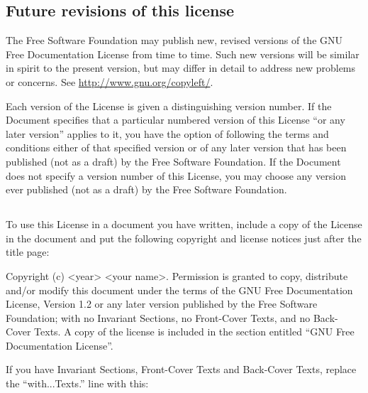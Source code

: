\subsection*{{\tiny{}Future revisions of this license}}

{\tiny{}The Free Software Foundation may publish new, revised versions
of the GNU Free Documentation License from time to time. Such new
versions will be similar in spirit to the present version, but may
differ in detail to address new problems or concerns. See \url{http://www.gnu.org/copyleft/}.}{\tiny\par}

{\tiny{}Each version of the License is given a distinguishing version
number. If the Document specifies that a particular numbered version
of this License \textquotedblleft or any later version\textquotedblright{}
applies to it, you have the option of following the terms and conditions
either of that specified version or of any later version that has
been published (not as a draft) by the Free Software Foundation. If
the Document does not specify a version number of this License, you
may choose any version ever published (not as a draft) by the Free
Software Foundation.}{\tiny\par}

\subsection*{}

{\tiny{}To use this License in a document you have written, include
a copy of the License in the document and put the following copyright
and license notices just after the title page:}{\tiny\par}

{\tiny{}Copyright (c) <year> <your name>. Permission is granted to
copy, distribute and/or modify this document under the terms of the
GNU Free Documentation License, Version 1.2 or any later version published
by the Free Software Foundation; with no Invariant Sections, no Front-Cover
Texts, and no Back-Cover Texts. A copy of the license is included
in the section entitled \textquotedblleft GNU Free Documentation License\textquotedblright .}{\tiny\par}

{\tiny{}If you have Invariant Sections, Front-Cover Texts and Back-Cover
Texts, replace the \textquotedblleft with...Texts.\textquotedblright{}
line with this:}{\tiny\par}


